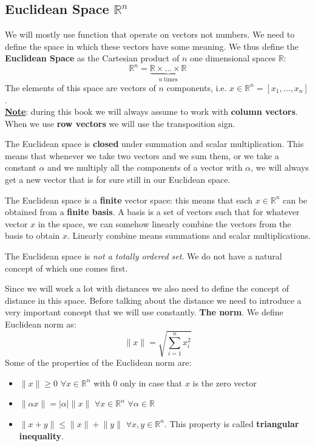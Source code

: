 \subsection{Euclidean Space \texorpdfstring{$\mathbb{R}^n$}{Rn}}
\par We will mostly use function that operate on vectors not numbers. We need to define the space in which these vectors have some meaning. We thus define the \textbf{Euclidean Space} as the Cartesian product of $n$ one dimensional spaces $\mathbb{R}$:
\begin{equation}
    \mathbb{R}^n = \underbrace{\mathbb{R} \times ... \times \mathbb{R}}_{n\ \text{times}}
    \label{eq:euclidean_space}
\end{equation}
The elements of this space are vectors of $n$ components, i.e. $x \in \mathbb{R}^n = [x_1, ..., x_n]$.\\[5px]
\underline{\textbf{Note}}: during this book we will always assume to work with \textbf{column vectors}. When we use \textbf{row vectors} we will use the transposition sign.\\[5px]
\par The Euclidean space is \textbf{closed} under summation and scalar multiplication. This means that whenever we take two vectors and we sum them, or we take a constant $\alpha$ and we multiply all the components of a vector with $\alpha$, we will always get a new vector that is for sure still in our Euclidean space.
\par The Euclidean space is a \textbf{finite} vector space: this means that each $x \in \mathbb{R}^n$ can be obtained from a \textbf{finite basis}. A basis is a set of vectors such that for whatever vector $x$ in the space, we can somehow linearly combine the vectors from the basis to obtain $x$. Linearly combine means summations and scalar multiplications.
\par The Euclidean space is \textit{not a totally ordered set}. We do not have a natural concept of which one comes first.
\par Since we will work a lot with distances we also need to define the concept of distance in this space. Before talking about the distance we need to introduce a very important concept that we will use constantly. \textbf{The norm}. We define Euclidean norm as:
\begin{equation}
    \lVert x \rVert = \sqrt{\sum_{i=1}^n x_i^2}
    \label{eq:2norm_def}
\end{equation}
Some of the properties of the Euclidean norm are:
\begin{itemize}
    \item $\lVert x \rVert \geq 0$ $\forall x \in \mathbb{R}^n$ with 0 only in case that $x$ is the zero vector
    \item $\lVert \alpha x \rVert = |\alpha| \lVert x \rVert$ $\forall x \in \mathbb{R}^n$ $\forall \alpha \in \mathbb{R}$
    \item $\lVert x+y \rVert \leq \lVert x \rVert + \lVert y \rVert$ $\forall x,y \in \mathbb{R}^n$. This property is called \textbf{triangular inequality}.
\end{itemize}
